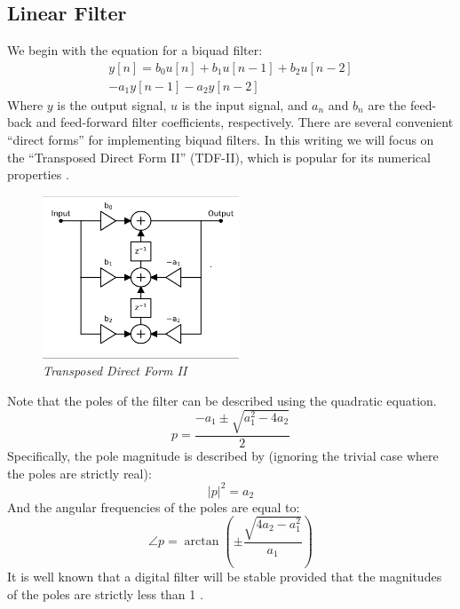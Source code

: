 \documentclass[twoside,a4paper]{article}
\begin{document}
\subsection{Linear Filter}
%
We begin with the equation for a biquad filter:
%
\begin{equation}
\begin{split}
    y[n] = b_0 u[n] + b_1 u[n-1] + b_2 u[n-2] \\ - a_1 y[n-1] - a_2 y[n-2]
\end{split}
    \label{eq:bq}
\end{equation}
%
Where $y$ is the output signal, $u$ is the input signal, and $a_n$ and $b_n$
are the feed-back and feed-forward filter coefficients, respectively.
There are several convenient ``direct forms'' for implementing biquad filters.
In this writing we will focus on the ``Transposed Direct Form II'' (TDF-II),
which is popular for its numerical properties \cite{JOSFilters}.
%
\begin{figure}[ht]
    \center
    \includegraphics[width=2.3in]{../Pics/TDF-II-White.png}
    \caption{\label{TDF-II}{\it Transposed Direct Form II}}
\end{figure}
%
Note that the poles of the filter can be described using the quadratic
equation.
\begin{equation}
    p = \frac{-a_1 \pm \sqrt{a_1^2- 4a_2}}{2}
    \label{eq:poles_lin}
\end{equation}
%
Specifically, the pole magnitude is described by (ignoring the
trivial case where the poles are strictly real):
\begin{equation}
    |p|^2 = a_2
    \label{eq:poles_lin_mag}
\end{equation}
%
And the angular frequencies of the poles are equal to:
\begin{equation}
    \angle p = \arctan \left( \pm \frac{\sqrt{4a_2 - a_1^2}}{a_1} \right)
    \label{eq:poles_lin_angle}
\end{equation}
%
It is well known that a digital filter will be stable provided that
the magnitudes of the poles are strictly less than 1 \cite{JOSFilters}.
\newline
%
\end{document}
